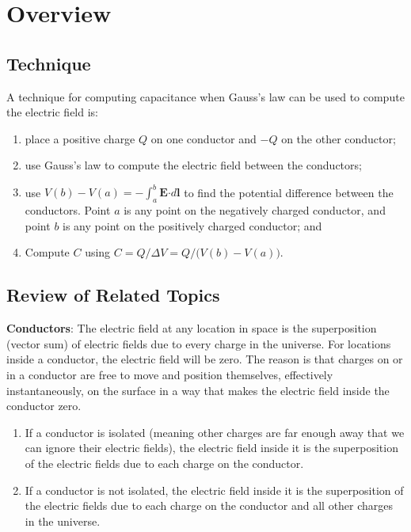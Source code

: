\documentclass{article}
\newcommand{\ds}[0]{\displaystyle}
\newcommand{\bfcdot}[0]{\boldsymbol{\cdot}}
\begin{document}
\section{Overview}

\subsection{Technique}

A technique for computing capacitance when Gauss's law can be used to compute the electric field is:

\begin{enumerate}

  \item place a positive charge $Q$ on one conductor and $-Q$ on the other conductor;

  \item use Gauss's law to compute the electric field between the conductors;

  \item use $V(b)-V(a)=-\int^b_a \mathbf{E}\bfcdot d\mathbf{l}$ to find the potential difference between the conductors. Point $a$ is any point on the negatively charged conductor, and point $b$ is any point on the positively charged conductor; and

  \item Compute $C$ using $\ds C = {Q}/{\Delta V} = Q/\big(V(b)-V(a)\big)$.

\end{enumerate}

\subsection{Review of Related Topics}

\textbf{Conductors}: The electric field at any location in space is the superposition (vector sum) of electric fields due to every charge in the universe. For locations inside a conductor, the electric field will be zero. The reason is that charges on or in a conductor are free to move and position themselves, effectively instantaneously, on the surface in a way that makes the electric field inside the conductor zero.

\begin{enumerate}

  \item If a conductor is isolated (meaning other charges are far enough away that we can ignore their electric fields), the electric field inside it is the superposition of the electric fields due to each charge on the conductor.

  \item If a conductor is not isolated, the electric field inside it is the superposition of the electric fields due to each charge on the conductor and all other charges in the universe.

\end{enumerate}
\end{document}
